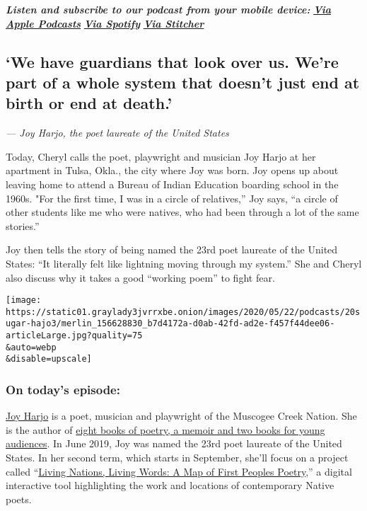 \emph{\textbf{Listen and subscribe to our podcast from your mobile
device:}}
\textbf{\href{https://podcasts.apple.com/us/podcast/sugar-calling/id1505881384}{\emph{Via
Apple Podcasts}}} \emph{\textbf{\textbar{}}}
\textbf{\href{https://open.spotify.com/show/4U8hPiNGIBvTS9zLeiDCN7?si=gRyigD47SPWl-QWgNjgt2w}{\emph{Via
Spotify}}} \emph{\textbf{\textbar{}}}
\textbf{\href{https://www.stitcher.com/podcast/the-new-york-times/sugar-calling}{\emph{Via
Stitcher}}}

\hypertarget{we-have-guardians-that-look-over-us-were-part-of-a-whole-system-that-doesnt-just-end-at-birth-or-end-at-death}{%
\subsection{`We have guardians that look over us. We're part of a whole
system that doesn't just end at birth or end at
death.'}\label{we-have-guardians-that-look-over-us-were-part-of-a-whole-system-that-doesnt-just-end-at-birth-or-end-at-death}}

\emph{--- Joy Harjo, the poet laureate of the United States}

Today, Cheryl calls the poet, playwright and musician Joy Harjo at her
apartment in Tulsa, Okla., the city where Joy was born. Joy opens up
about leaving home to attend a Bureau of Indian Education boarding
school in the 1960s. "For the first time, I was in a circle of
relatives,'' Joy says, ``a circle of other students like me who were
natives, who had been through a lot of the same stories.''

Joy then tells the story of being named the 23rd poet laureate of the
United States: ``It literally felt like lightning moving through my
system.'' She and Cheryl also discuss why it takes a good ``working
poem'' to fight fear.

\texttt{[image: https://static01.graylady3jvrrxbe.onion/images/2020/05/22/podcasts/20sugar-hajo3/merlin\_156628830\_b7d4172a-d0ab-42fd-ad2e-f457f44dee06-articleLarge.jpg?quality=75\\\&auto=webp\\\&disable=upscale]}

\hypertarget{on-todays-episode}{%
\subsubsection{\texorpdfstring{\textbf{On today's
episode:}}{On today's episode:}}\label{on-todays-episode}}

\href{https://www.joyharjo.com/}{Joy Harjo} is a poet, musician and
playwright of the Muscogee Creek Nation. She is the author of
\href{https://www.nytimes3xbfgragh.onion/2019/06/19/books/joy-harjo-poet-laureate.html?searchResultPosition=3}{eight
books of poetry, a memoir and two books for young audiences}. In June
2019, Joy was named the 23rd poet laureate of the United States. In her
second term, which starts in September, she'll focus on a project called
``\href{https://www.nytimes3xbfgragh.onion/2020/04/30/books/joy-harjo-poet-laureate-second-term.html?searchResultPosition=1}{Living
Nations, Living Words: A Map of First Peoples Poetry},'' a digital
interactive tool highlighting the work and locations of contemporary
Native poets.

